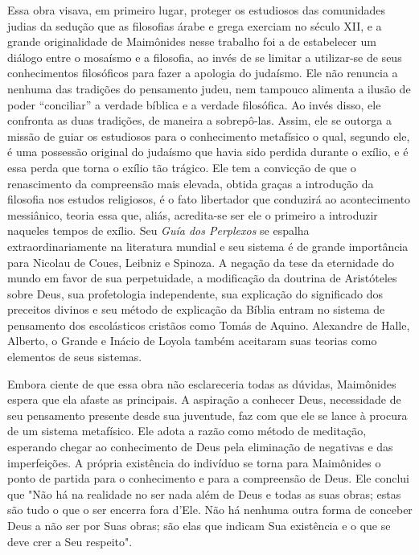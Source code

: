 Essa obra visava, em primeiro lugar, proteger os estudiosos das
co­munidades judias da sedução que as filosofias árabe e grega exerciam
no século XII, e a grande originalidade de Maimônides nesse trabalho foi
a de estabelecer um diálogo entre o mosaísmo e a filosofia, ao invés de
se limitar a utilizar-se de seus conhecimentos filosóficos para fazer a
apologia do judaísmo. Ele não renuncia a nenhuma das tradições do
pensamento judeu, nem tampouco ali­menta a ilusão de poder ``conciliar'' a
verdade bíblica e a verdade filosófica. Ao invés disso, ele confronta as
duas tradições, de maneira a sobrepô-las. As­sim, ele se outorga a
missão de guiar os estudiosos para o conhecimento meta­físico o qual,
segundo ele, é uma possessão original do judaísmo que havia sido perdida
durante o exílio, e é essa perda que torna o exílio tão trágico. Ele tem
a convicção de que o renascimento da compreensão mais elevada, obtida
gra­ças a introdução da filosofia nos estudos religiosos, é o fato
libertador que con­duzirá ao acontecimento messiânico, teoria essa que,
aliás, acredita-se ser ele o primeiro a introduzir naqueles tempos de
exílio.
Seu \emph{Guía dos Perplexos} se espalha extraordinariamente na
literatura mundial e seu sistema é de grande importância para Nicolau de
Coues, Leibniz e Spinoza. A negação da tese da eternidade do mundo em
favor de sua perpe­tuidade, a modificação da doutrina de Aristóteles
sobre Deus, sua profetologia independente, sua explicação do significado
dos preceitos divinos e seu méto­do de explicação da Bíblia entram no
sistema de pensamento dos escolásticos cristãos como Tomás de Aquino.
Alexandre de Halle, Alberto, o Grande e Iná­cio de Loyola também
aceitaram suas teorias como elementos de seus sistemas.

Embora ciente de que essa obra não esclareceria todas as dúvidas,
Maimônides espera que ela afaste as principais. A aspiração a conhecer
Deus, necessidade de seu pensamento presente desde sua juventude, faz
com que ele se lance à procura de um sistema metafísico. Ele adota a
razão como método de meditação, esperando chegar ao conhecimento de Deus
pela eliminação de negativas e das imperfeições. A própria existência do
indivíduo se torna para Maimônides o ponto de partida para o
conhecimento e para a compreensão de Deus. Ele conclui que "Não há na
realidade no ser nada além de Deus e to­das as suas obras; estas são
tudo o que o ser encerra fora d'Ele. Não há nenhu­ma outra forma de
conceber Deus a não ser por Suas obras; são elas que indi­cam Sua
existência e o que se deve crer a Seu respeito".

